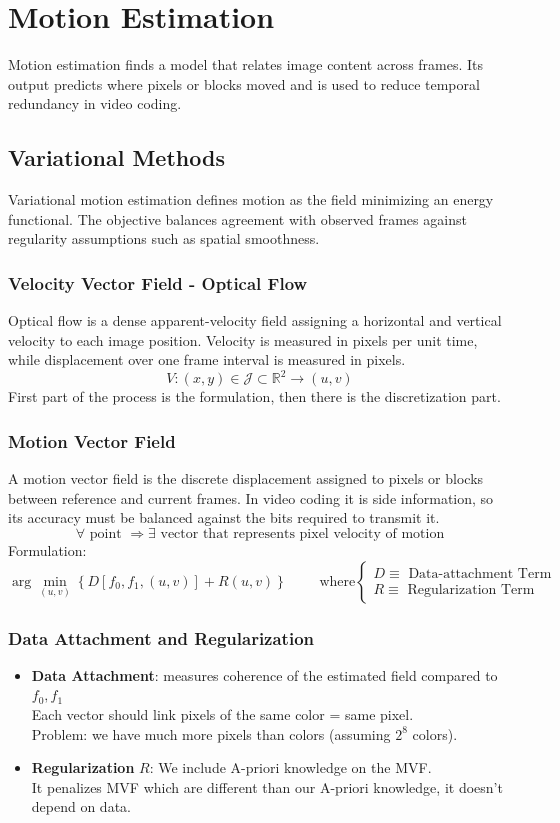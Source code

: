 \section{Motion Estimation}
Motion estimation finds a model that relates image content across frames. Its output predicts where pixels or blocks moved and is used to reduce temporal redundancy in video coding.
\subsection{Variational Methods}
Variational motion estimation defines motion as the field minimizing an energy functional. The objective balances agreement with observed frames against regularity assumptions such as spatial smoothness.
\subsubsection{Velocity Vector Field - Optical Flow}
Optical flow is a dense apparent-velocity field assigning a horizontal and vertical velocity to each image position. Velocity is measured in pixels per unit time, while displacement over one frame interval is measured in pixels.
$$V : (x,y) \in \mathcal{J} \subset \mathbb{R}^2 \to (u,v)$$
First part of the process is the formulation, then there is the discretization part.
\subsubsection{Motion Vector Field}
A motion vector field is the discrete displacement assigned to pixels or blocks between reference and current frames. In video coding it is side information, so its accuracy must be balanced against the bits required to transmit it.
$$\forall \text{ point } \Longrightarrow \exists \text{ vector that represents pixel velocity of motion}$$
Formulation:
$$\arg\min_{(u,v)} \left\{D\left[f_0, f_1, (u,v)\right] + R(u,v)\right\} \qquad \text{ where}\begin{cases}
    D \equiv \text{ Data-attachment Term}\\
    R \equiv \text{ Regularization Term}
\end{cases}$$
\subsubsection{Data Attachment and Regularization}
\begin{itemize}
    \item \textbf{Data Attachment}: measures coherence of the estimated field compared to $f_0, f_1$\\
    Each vector should link pixels of the same color = same pixel.\\
    Problem: we have much more pixels than colors (assuming $2^8$ colors).
    \item \textbf{Regularization} $R$: We include A-priori knowledge on the MVF.\\
    It penalizes MVF which are different than our A-priori knowledge, it doesn't depend on data.
\end{itemize}
